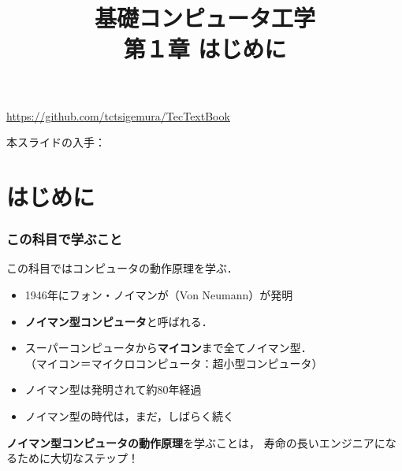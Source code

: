 \documentclass[handout]{beamer}        %
\begin{document}
\title{基礎コンピュータ工学\\第１章 はじめに}
\date{}

\begin{frame}
  \titlepage
  \centerline{\url{https://github.com/tctsigemura/TecTextBook}}
  \vfill
  \centerline{本スライドの入手：
    }
\end{frame}


\section{はじめに}
\begin{frame}
  \frametitle{この科目で学ぶこと}
  この科目ではコンピュータの動作原理を学ぶ．
  \vfill
  \begin{itemize}
  \item 1946年にフォン・ノイマンが（Von Neumann）が発明
  \item {\bf ノイマン型コンピュータ}と呼ばれる．
  \item スーパーコンピュータから{\bf マイコン}まで全てノイマン型．\\
    （マイコン＝マイクロコンピュータ：超小型コンピュータ）
  \item ノイマン型は発明されて約80年経過
  \item ノイマン型の時代は，まだ，しばらく続く
  \end{itemize}
  \vfill
  {\bf ノイマン型コンピュータの動作原理}を学ぶことは，
  寿命の長いエンジニアになるために大切なステップ！
\end{frame}
\end{document}
